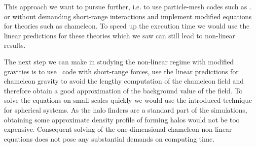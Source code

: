 This approach we want to pursue further, i.e. to use particle-mesh codes such as .  or  without demanding short-range interactions and implement modified equations for theories such as chameleon. To speed up the execution time we would use the linear predictions for these theories which we saw can still lead to non-linear results.

The next step we can make in studying the non-linear regime with modified gravities is to use \nbody\ code with short-range forces, use the linear predictions for chameleon gravity to avoid the lengthy computation of the chameleon field and therefore obtain a good approximation of the background value of the field. To solve the equations on small scales quickly we would use the introduced technique for spherical systems. As the halo finders are a standard part of the simulations, obtaining some approximate density profile of forming halos would not be too expensive. Consequent solving of the one-dimensional chameleon non-linear equations does not pose any substantial demands on computing time.